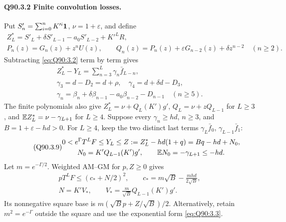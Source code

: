 \paragraph{Q90.3.2 Finite convolution losses.}
Put \(S'_n=\allowbreak \sum_{i=\allowbreak 0}^nK'^i\mathbf1\), \(\nu=\allowbreak 1+\varepsilon\), and define
\begin{equation}\tag{Q90.3.7}\label{eq:Q90:3.7}
\begin{gathered}
Z_L^*=S'_L+\delta S'_{L-1}-a_0S'_{L-2}+K'^LR,\\
P_n(z)=G_n(z)+z^nU(z),\qquad
Q_n(z)=P_n(z)+\varepsilon G_{n-2}(z)+\delta z^{n-2}
\quad(n\ge2).
\end{gathered}
\end{equation}
Subtracting \eqref{eq:Q90:3.2} term by term gives
\begin{equation}\tag{Q90.3.8}\label{eq:Q90:3.8}
\begin{gathered}
Z_L^*-Y_L=\sum_{n=3}^L\gamma_n\bar f_{L-n},\\
\gamma_3=d-D_2=d+\rho,\quad
\gamma_4=d+\delta d-D_3,\\
\gamma_n=\beta_n+\delta\beta_{n-1}-a_0\beta_{n-2}-D_{n-1}
\quad(n\ge5).
\end{gathered}
\end{equation}
The finite polynomials also give
\(Z_L^*=\allowbreak \nu+Q_L(K')g'\), \(Q_L=\allowbreak \nu+zQ_{L-1}\) for \(L\ge\allowbreak 3\),
and \(\mathbb E Z_L^*=\allowbreak \nu-\gamma_{L+1}\) for \(L\ge\allowbreak 4\).
Suppose every \(\gamma_n\ge\allowbreak  hd\), \(n\ge\allowbreak 3\), and
\(B=\allowbreak 1+\varepsilon-hd>\allowbreak 0\). For \(L\ge\allowbreak 4\), keep the two distinct
last terms \(\gamma_L\bar f_0\), \(\gamma_{L-1}\bar f_1\):
\begin{equation}\tag{Q90.3.9}\label{eq:Q90:3.9}
\begin{gathered}
0<e^\Gamma T^LF\le Y_L\le Z:=Z_L^*-hd(1+q)=Bq-hd+N_0,\\
N_0=K'Q_{L-1}(K')g',\qquad\mathbb E N_0=-\gamma_{L+1}\le-hd.
\end{gathered}
\end{equation}
Let \(m=\allowbreak e^{-\Gamma/2}\). Weighted AM--GM for \(p,\allowbreak Z\ge\allowbreak 0\) gives
\begin{equation}\tag{Q90.3.10}\label{eq:Q90:3.10}
\begin{gathered}
pT^LF\le(c_*+N/2)^2,\qquad
c_*=m\sqrt B-\frac{mhd}{2\sqrt B},\\
N=K'V_*,\qquad V_*=\frac m{\sqrt B}Q_{L-1}(K')g'.
\end{gathered}
\end{equation}
Its nonnegative square base is
\(m(\sqrt Bp+Z/\sqrt B)/2\).
Alternatively, retain \(m^2=\allowbreak e^{-\Gamma}\) outside the square and
use the exponential form \eqref{eq:Q90:3.3}.


